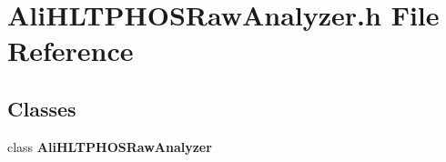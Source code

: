 \section{Ali\-HLTPHOSRaw\-Analyzer.h File Reference}
\label{AliHLTPHOSRawAnalyzer_8h}


\subsection*{Classes}
\begin{CompactItemize}
\item 
class {\bf Ali\-HLTPHOSRaw\-Analyzer}
\end{CompactItemize}
